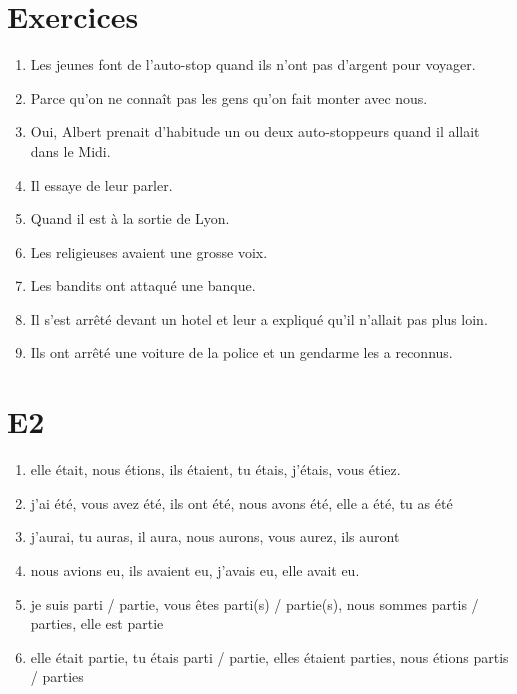 \documentclass{book}
\begin{document}
    \section{Exercices}
        \begin{enumerate}
            \item Les jeunes font de l'auto-stop quand ils n'ont pas d'argent pour voyager.
            \item Parce qu'on ne connaît pas les gens qu'on fait monter avec nous.
            \item Oui, Albert prenait d'habitude un ou deux auto-stoppeurs quand il allait dans le Midi.
            \item Il essaye de leur parler.
            \item Quand il est à la sortie de Lyon.
            \item Les religieuses avaient une grosse voix.
            \item Les bandits ont attaqué une banque.
            \item Il s'est arrêté devant un hotel et leur a expliqué qu'il n'allait pas plus loin.
            \item Ils ont arrêté une voiture de la police et un gendarme les a reconnus.
        \end{enumerate}
    \section{E2}
        \begin{enumerate}
            \item elle était, nous étions, ils étaient, tu étais, j'étais, vous étiez.
            \item j'ai été, vous avez été, ils ont été, nous avons été, elle a été, tu as été
            \item j'aurai, tu auras, il aura, nous aurons, vous aurez, ils auront
            \item nous avions eu, ils avaient eu, j'avais eu, elle avait eu.
            \item je suis parti / partie, vous êtes parti(s) / partie(s), nous sommes partis / parties, elle est partie
            \item elle était partie, tu étais parti / partie, elles étaient parties, nous étions partis / parties
        \end{enumerate}
\end{document}
